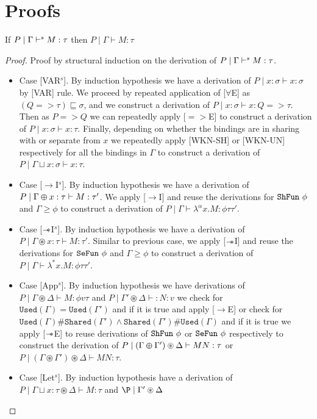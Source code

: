 \chapter{Proofs}
\begin{thm}\label{thm:soundness-syntax-directed}
   If $P \mid \Gamma \vdash^s M:\tau$ then $P \mid \Gamma \vdash M:\tau$
\end{thm}
\begin{proof}
  Proof by structural induction on the derivation of $P \mid \Gamma \vdash^s M:\tau$.

  \begin{itemize}
  \item{Case [VAR$^s$].}
    By induction hypothesis we have a derivation of $P \mid x:\sigma \vdash x:\sigma$ by [VAR] rule.
    We proceed by repeated application of [$\forall$E] as $(Q => \tau) \sqsubseteq \sigma$, and
    we construct a derivation of $P \mid x:\sigma \vdash x: Q => \tau$. Then as $P => Q$ we can
    repeatedly apply [$=>$E] to construct a derivation of $P \mid x:\sigma \vdash x:\tau$.
    Finally, depending on whether the bindings are in sharing with or separate from
    $x$ we repeatedly apply [WKN-SH] or [WKN-UN] respectively for all the bindings in $\Gamma$ to construct
    a derivation of $P \mid \Gamma \sqcup x:\sigma \vdash x:\tau$.
  \item{Case [$\rightarrow$I$^s$].}
    By induction hypothesis we have a derivation of $P \mid \Gamma \varoplus x:\tau \vdash M:\tau'$.
    We apply [$\rightarrow$I] and reuse the derivations for $\texttt{ShFun}\ \phi$ and $\Gamma \geq \phi$  to
    construct a derivation of $P \mid \Gamma \vdash \lambda^{\alpha}x. M: \phi \tau \tau'$.
  \item{Case [$\mathrel{-\mkern-6mu*}$I$^s$].}
    By induction hypothesis we have a derivation of $P \mid \Gamma \circledast x:\tau \vdash M:\tau'$.
    Similar to previous case, we apply [$\mathrel{-\mkern-6mu*}$I] and reuse the derivations for $\texttt{SeFun}\ \phi$ and $\Gamma \geq \phi$  to
    construct a derivation of $P \mid \Gamma \vdash \lambda^{*}x. M: \phi \tau \tau'$.
  \item{Case [App$^s$].}
    By induction hypothesis we have derivations of $P \mid \Gamma \circledast \Delta \vdash M: \phi v \tau$ and
    $P \mid \Gamma' \circledast \Delta \vdash: N:v$ we check for $\texttt{Used}(\Gamma) = \texttt{Used}(\Gamma')$ and if it is true
    and apply [$\rightarrow$E] or check for $\texttt{Used}(\Gamma)\#\texttt{Shared}(\Gamma') \wedge \texttt{Shared}(\Gamma')\#\texttt{Used}(\Gamma)$
    and if it is true we apply [$\mathrel{-\mkern-6mu*}$E] to reuse derivations of $\texttt{ShFun}\ \phi$ or $\texttt{SeFun}\ \phi$ respectively to construct the derivation
    of $P \mid (\Gamma \varoplus \Gamma') \circledast \Delta \vdash M N:\tau$ or $P \mid (\Gamma \circledast \Gamma') \circledast \Delta \vdash M N:\tau$.
  \item{Case [Let$^s$].}
    By induction hypothesis have a derivation of $P \mid \Gamma \sqcup x:\tau \circledast \Delta \vdash M:\tau$ and $\P \mid \Gamma' \circledast \Delta$
  \end{itemize}
\end{proof}

